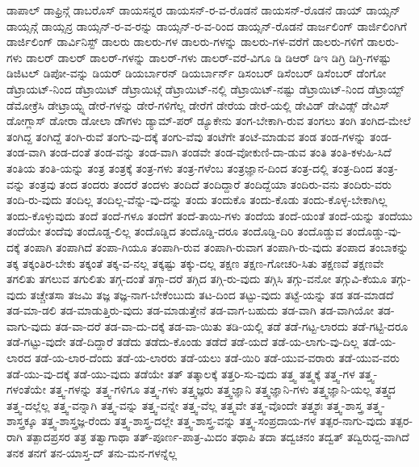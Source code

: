{ಡಾಪಾಲ್
ಡಾಫ್ರಿನ್ಗೆ
ಡಾಬರೊಸ್
ಡಾಯಸನ್ನರ
ಡಾಯಸನ್-ರ-ವ-ರೊಡನೆ
ಡಾಯಸನ್-ರೊಡನೆ
ಡಾಯ್
ಡಾಯ್ಸನ್
ಡಾಯ್ಸನ್ಗೆ
ಡಾಯ್ಸನ್ರ
ಡಾಯ್ಸನ್-ರ-ವ-ರನ್ನು
ಡಾಯ್ಸನ್-ರ-ವ-ರಿಂದ
ಡಾಯ್ಸನ್-ರೊಡನೆ
ಡಾರ್ಜಲಿಂಗ್
ಡಾರ್ಜಿಲಿಂಗಿಗೆ
ಡಾರ್ಜಿಲಿಂಗ್
ಡಾರ್ವಿನಿಸ್ಟ್
ಡಾಲರು
ಡಾಲರು-ಗಳ
ಡಾಲರು-ಗಳನ್ನು
ಡಾಲರು-ಗಳ-ವರೆಗೆ
ಡಾಲರು-ಗಳಿಗೆ
ಡಾಲರು-ಗಳು
ಡಾಲರ್
ಡಾಲರ್
ಡಾಲರ್-ಗಳನ್ನು
ಡಾಲರ್-ಗಳು
ಡಾಲರ್-ವರೆ-ವಿಗೂ
ಡಿ
ಡಿಆರ್
ಡಿಇ
ಡಿಗ್ರಿ
ಡಿಗ್ರಿ-ಗಳಷ್ಟು
ಡಿಜಿಟಲ್
ಡಿಪೋ-ವನ್ನು
ಡಿಯರ್
ಡಿಯರ್ಬಾರನ್
ಡಿಯರ್ಬಾರ್ನ್
ಡಿಸಂಬರ್
ಡಿಸೆಂಬರ್
ಡಿಸೆಂಬರ್
ಡೆಂಗೋ
ಡೆಟ್ರಾಯಟ್-ನಿಂದ
ಡೆಟ್ರಾಯಿಟ್
ಡೆಟ್ರಾಯಿಟ್ಗೆ
ಡೆಟ್ರಾಯಿಟ್-ನಲ್ಲಿ
ಡೆಟ್ರಾಯಿಟ್-ನಷ್ಟು
ಡೆಟ್ರಾಯಿಟ್-ನಿಂದ
ಡೆಟ್ರಾಯ್ಟ್
ಡೆಮೋಕ್ರೆಸಿ
ಡೇಟ್ರಾಯ್ಟ್ನ
ಡೇರೆ-ಗಳನ್ನು
ಡೇರೆ-ಗಳಿಗೆಲ್ಲ
ಡೇರೆಗೆ
ಡೇರೆಯ
ಡೇರೆ-ಯಲ್ಲಿ
ಡೇವಿಡ್
ಡೇವಿಡ್ಸ್
ಡೇವಿಸ್
ಡೋಗ್ಲಾಸ್
ಡೋರಾ
ಡೋಲಾ
ಡೌಗಳು
ಡ್ಯಾಮ್-ಪರ್
ಡ್ಯೂಕೇನು
ತಂಗ-ಬೇಕಾಗಿ-ರುವ
ತಂಗಲು
ತಂಗಿ
ತಂಗಿದ-ಮೇಲೆ
ತಂಗಿದ್ದ
ತಂಗಿದ್ದೆ
ತಂಗಿ-ರುವೆ
ತಂಗು-ವು-ದಕ್ಕೆ
ತಂಗು-ವೆವು
ತಂಟೆಗೇ
ತಂಟೆ-ಮಾಡುವ
ತಂಡ
ತಂಡ-ಗಳನ್ನು
ತಂಡ-ತಂಡ-ವಾಗಿ
ತಂಡ-ದಂತೆ
ತಂಡ-ವನ್ನು
ತಂಡ-ವಾಗಿ
ತಂಡವೇ
ತಂಡ-ವೋಕುಣಿ-ದಾ-ಡುವ
ತಂತಿ
ತಂತಿ-ಕಳುಹಿ-ಸಿದೆ
ತಂತಿಯ
ತಂತಿ-ಯನ್ನು
ತಂತ್ರ
ತಂತ್ರಕ್ಕೆ
ತಂತ್ರ-ಗಳು
ತಂತ್ರ-ಗಳೆಂಬ
ತಂತ್ರಜ್ಞಾನ-ದಿಂದ
ತಂತ್ರ-ದಲ್ಲಿ
ತಂತ್ರ-ದಿಂದ
ತಂತ್ರ-ವನ್ನು
ತಂತ್ರವು
ತಂದ
ತಂದರು
ತಂದರೆ
ತಂದಳು
ತಂದಿದೆ
ತಂದಿದ್ದಾರೆ
ತಂದಿದ್ದೆಯಾ
ತಂದಿರು-ವನು
ತಂದಿರು-ವರು
ತಂದಿ-ರು-ವುದು
ತಂದಿಲ್ಲ
ತಂದಿಲ್ಲ-ವೆನ್ನು-ವು-ದನ್ನು
ತಂದು
ತಂದುಕೊ
ತಂದು-ಕೊಡು
ತಂದು-ಕೊಳ್ಳ-ಬೇಕಾಗಿಲ್ಲ
ತಂದು-ಕೊಳ್ಳುವುದು
ತಂದೆ
ತಂದೆ-ಗಳೂ
ತಂದೆಗೆ
ತಂದೆ-ತಾಯಿ-ಗಳು
ತಂದೆಯ
ತಂದೆ-ಯಂತೆ
ತಂದೆ-ಯನ್ನು
ತಂದೆಯು
ತಂದೆಯೇ
ತಂದೆವು
ತಂದೊಡ್ಡ-ಲಿಲ್ಲ
ತಂದೊಡ್ಡಿದ
ತಂದೊಡ್ಡಿ-ದರೂ
ತಂದೊಡ್ಡಿ-ದಿರಿ
ತಂದೊಡ್ಡುವ
ತಂದೊಡ್ಡು-ವು-ದಕ್ಕೆ
ತಂಪಾಗಿ
ತಂಪಾಗಿದೆ
ತಂಪಾ-ಗಿಯೂ
ತಂಪಾಗಿ-ರುವ
ತಂಪಾಗಿ-ರುವಾಗ
ತಂಪಾಗಿ-ರು-ವುದು
ತಂಪಾದ
ತಂಬಾಕನ್ನು
ತಕ್ಕ
ತಕ್ಕಂತಿರ-ಬೇಕು
ತಕ್ಕಂತೆ
ತಕ್ಕ-ವ-ನಲ್ಲ
ತಕ್ಕಷ್ಟು
ತಕ್ಕು-ದಲ್ಲ
ತಕ್ಷಣ
ತಕ್ಷಣ-ಗೋಚರಿ-ಸಿತು
ತಕ್ಷಣವೆ
ತಕ್ಷಣವೇ
ತಗಲಿತು
ತಗಲುವ
ತಗುಲಿತು
ತಗ್ಗ-ದಂತೆ
ತಗ್ಗಾ-ದರೆ
ತಗ್ಗಿದ
ತಗ್ಗಿ-ರು-ವುದು
ತಗ್ಗಿಸಿ
ತಗ್ಗು-ವನೋ
ತಗ್ಗುವಿ-ಕೆಯೂ
ತಗ್ಗು-ವುದು
ತಚ್ಚೇತಸಾ
ತಜಮಿ
ತಜ್ಞ
ತಜ್ಞ-ನಾಗ-ಬೇಕೆಂಬುದು
ತಟ-ದಿಂದ
ತಟ್ಟು-ವುದು
ತಟ್ಟೆ-ಯನ್ನು
ತಡ
ತಡ-ಮಾಡದೆ
ತಡ-ಮಾ-ಡಲಿ
ತಡ-ಮಾಡುತ್ತಿರು-ವುದು
ತಡ-ಮಾಡುತ್ತೇನೆ
ತಡ-ವಾಗ-ಬಹುದು
ತಡ-ವಾಗಿ
ತಡ-ವಾಗಿಯೋ
ತಡ-ವಾಗು-ವುದು
ತಡ-ವಾ-ದರೆ
ತಡ-ವಾ-ದು-ದಕ್ಕೆ
ತಡ-ವಾ-ಯಿತು
ತಡಿ-ಯಲ್ಲಿ
ತಡೆ
ತಡೆ-ಗಟ್ಟ-ಲಾರದು
ತಡೆ-ಗಟ್ಟಿ-ದರೂ
ತಡೆ-ಗಟ್ಟು-ವುದೇ
ತಡೆ-ದಿದ್ದಾರೆ
ತಡೆದು
ತಡೆದು-ಕೊಂಡು
ತಡೆದೆ
ತಡೆ-ಯದೆ
ತಡೆ-ಯ-ಲಾಗು-ವು-ದಿಲ್ಲ
ತಡೆ-ಯ-ಲಾರದ
ತಡೆ-ಯ-ಲಾರ-ದೆಂದು
ತಡೆ-ಯ-ಲಾರರು
ತಡೆ-ಯಲು
ತಡೆ-ಯಿರಿ
ತಡೆ-ಯುವ-ವರಾರು
ತಡೆ-ಯುವ-ವರು
ತಡೆ-ಯು-ವು-ದಕ್ಕೆ
ತಡೆ-ಯು-ವುದು
ತಡೆಯೇ
ತತ್
ತತ್ಕಾಲಕ್ಕೆ
ತತ್ತರಿ-ಸು-ವುದು
ತತ್ತ್ವ
ತತ್ತ್ವಕ್ಕೆ
ತತ್ತ್ವ-ಗಳ
ತತ್ತ್ವ-ಗಳಂತೆಯೇ
ತತ್ತ್ವ-ಗಳನ್ನು
ತತ್ತ್ವ-ಗಳಿಗೂ
ತತ್ತ್ವ-ಗಳು
ತತ್ತ್ವಜ್ಞರು
ತತ್ತ್ವಜ್ಞಾನಿ
ತತ್ತ್ವಜ್ಞಾನಿ-ಗಳು
ತತ್ತ್ವಜ್ಞಾನಿ-ಯಲ್ಲ
ತತ್ತ್ವದ
ತತ್ತ್ವ-ದಲ್ಲೆಲ್ಲ
ತತ್ತ್ವ-ವನ್ನಾಗಿ
ತತ್ತ್ವ-ವನ್ನು
ತತ್ತ್ವ-ವನ್ನೇ
ತತ್ತ್ವ-ವೆಲ್ಲ
ತತ್ತ್ವವೇ
ತತ್ತ್ವ-ವೊಂದೇ
ತತ್ತ್ವಶಃ
ತತ್ತ್ವ-ಶಾಸ್ತ್ರ
ತತ್ತ್ವ-ಶಾಸ್ತ್ರಕ್ಕೂ
ತತ್ತ್ವ-ಶಾಸ್ತ್ರಜ್ಞ-ರೆಂದು
ತತ್ತ್ವ-ಶಾಸ್ತ್ರ-ದಲ್ಲೇ
ತತ್ತ್ವ-ಶಾಸ್ತ್ರ-ವನ್ನು
ತತ್ತ್ವ-ಸಂಪ್ರದಾಯ-ಗಳ
ತತ್ಪರ-ನಾಗು-ವುದು
ತತ್ಪರ-ರಾಗಿ
ತತ್ಪಾದಪ್ರಸರ
ತತ್ರ
ತತ್ವಾಗಾಥಾ
ತತ್-ಪೂರ್ಣ-ಪಾತ್ರ-ಮಿದಂ
ತಥಾಪಿ
ತದಾ
ತದ್ವಚನಂ
ತದ್ವತ್
ತದ್ವಿರುದ್ದ-ವಾಗಿದೆ
ತನಕ
ತನಗೆ
ತನ-ಯಾಸ್ತ-ದ್
ತನು-ಮನ-ಗಳನ್ನೆಲ್ಲ
}
